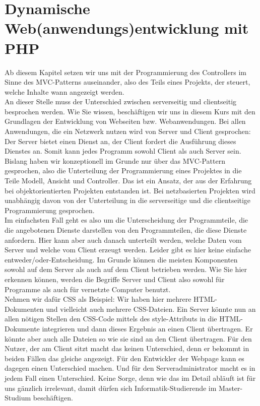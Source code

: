 \chapter[Dynamische Webentwicklung]{Dynamische Web(anwendungs)entwicklung mit PHP}

Ab diesem Kapitel setzen wir uns mit der Programmierung des Controllers im Sinne des MVC-Patterns auseinander, also des Teils eines Projekts, der steuert, welche Inhalte wann angezeigt werden.\\


An dieser Stelle muss der Unterschied zwischen serverseitig und clientseitig besprochen werden. Wie Sie wissen, beschäftigen wir uns in diesem Kurs mit den Grundlagen der Entwicklung von Webseiten bzw. Webanwendungen. Bei allen Anwendungen, die ein Netzwerk nutzen wird von Server und Client gesprochen: Der Server bietet einen Dienst an, der Client fordert die Ausführung dieses Dienstes an. Somit kann jedes Programm sowohl Client als auch Server sein.\\


Bislang haben wir konzeptionell im Grunde nur über das MVC-Pattern gesprochen, also die Unterteilung der Programmierung eines Projektes in die Teile Modell, Ansicht und Controller. Das ist ein Ansatz, der aus der Erfahrung bei objektorientierten Projekten entstanden ist. Bei netzbasierten Projekten wird unabhängig davon von der Unterteilung in die serverseitige und die clientseitige Programmierung gesprochen.\\


Im einfachsten Fall geht es also um die Unterscheidung der Programmteile, die die angebotenen Dienste darstellen von den Programmteilen, die diese Dienste anfordern. Hier kann aber auch danach unterteilt werden, welche Daten vom Server und welche vom Client erzeugt werden. Leider gibt es hier keine einfache entweder/oder-Entscheidung. Im Grunde können die meisten Komponenten sowohl auf dem Server als auch auf dem Client betrieben werden. Wie Sie hier erkennen können, werden die Begriffe Server und Client also sowohl für Programme als auch für vernetzte Computer benutzt.\\


Nehmen wir dafür CSS als Beispiel: Wir haben hier mehrere HTML-\\Dokumenten und vielleicht auch mehrere CSS-Dateien. Ein Server könnte nun an allen nötigen Stellen den CSS-Code mittels des style-Attributs in die HTML-Dokumente integrieren und dann dieses Ergebnis an einen Client übertragen. Er könnte aber auch alle Dateien so wie sie sind an den Client übertragen. Für den Nutzer, der am Client sitzt macht das keinen Unterschied, denn er bekommt in beiden Fällen das gleiche angezeigt. Für den Entwickler der Webpage kann es dagegen einen Unterschied machen. Und für den Serveradministrator macht es in jedem Fall einen Unterschied. Keine Sorge, denn wie das im Detail abläuft ist für uns gänzlich irrelevant, damit dürfen sich Informatik-Studierende im Master-Studium beschäftigen.\\


